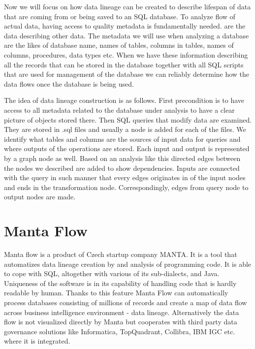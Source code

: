 
Now we will focus on how data lineage can be created to describe lifespan of data that are coming from or being saved to an SQL database.
To analyze flow of actual data, having access to quality metadata is fundamentally needed.
 are the data describing other data. The metadata we will use when analyzing a database are the likes of database name, names of tables, columns in tables, names of columns, procedures, data types etc.
When we have these information describing all the records that can be stored in the database together with all SQL scripts that are used for management of the database we can reliably determine how the data flows once the database is being used.

The idea of data lineage construction is as follows. First precondition is to have access to all metadata related to the database under analysis to have a clear picture of objects stored there. 
Then SQL queries that modify data are examined. They are stored in .sql files and usually a node is added for each of the files. We identify what tables and columns are the sources of input data for queries and where outputs of the operations are stored. Each input and output is represented by a graph node as well. Based on an analysis like this directed edges between the nodes we described are added to show dependencies. Inputs are connected with the query in such manner that every edges originates in of the input nodes and ends in the transformation node. Correspondingly, edges from query node to output nodes are made.




\section{Manta Flow}

Manta flow is a product of Czech startup company MANTA. It is a tool that automatizes data lineage creation by and analysis of programming code. It is able to cope with SQL, altogether with various of its sub-dialects, and Java. Uniqueness of the software is in its capability of handling code that is hardly readable by human. Thanks to this feature Manta Flow can automatically process databases consisting of millions of records and create a map of data flow across business intelligence environment - data lineage.
Alternatively the data flow is not visualized directly by Manta but cooperates with third party data governance solutions like Informatica, TopQuadrant, Collibra, IBM IGC etc. where it is integrated.

